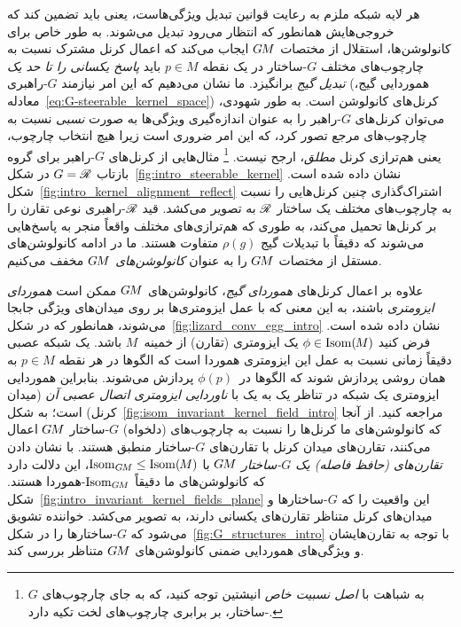هر لایه شبکه ملزم به رعایت قوانین تبدیل ویژگی‌هاست، یعنی باید تضمین کند که خروجی‌هایش همانطور که انتظار می‌رود تبدیل می‌شوند.
به طور خاص برای کانولوشن‌ها، استقلال از مختصات $G\mkern-1.4muM$ ایجاب می‌کند که اعمال کرنل مشترک نسبت به چارچوب‌های مختلف $G$-ساختار در یک نقطه $p\in M$ باید \emph{پاسخ یکسانی را تا حد یک تبدیل گیج} برانگیزد.
ما نشان می‌دهیم که این امر نیازمند $G$-راهبری (هموردایی گیج، معادله~\eqref{eq:G-steerable_kernel_space}) کرنل‌های کانولوشن است.
به طور شهودی، می‌توان کرنل‌های $G$-راهبر را به عنوان اندازه‌گیری ویژگی‌ها به صورت \emph{نسبی} نسبت به چارچوب‌های مرجع تصور کرد، که این امر ضروری است زیرا هیچ انتخاب چارچوب، یعنی هم‌ترازی کرنل \emph{مطلق}، ارجح نیست.%
\footnote{
	به شباهت با \emph{اصل نسبیت خاص} انیشتین توجه کنید، که به جای چارچوب‌های $G$-ساختار، بر برابری چارچوب‌های لخت تکیه دارد.
}
مثال‌هایی از کرنل‌های $G$-راهبر برای گروه بازتاب $G=\mathscr{R}$ در شکل~\ref{fig:intro_steerable_kernel} نشان داده شده است.
شکل~\ref{fig:intro_kernel_alignment_reflect} اشتراک‌گذاری چنین کرنل‌هایی را نسبت به چارچوب‌های مختلف یک ساختار $\mathscr{R}$ به تصویر می‌کشد.
قید $\mathscr{R}$-راهبری نوعی تقارن را بر کرنل‌ها تحمیل می‌کند، به طوری که هم‌ترازی‌های مختلف واقعاً منجر به پاسخ‌هایی می‌شوند که دقیقاً با تبدیلات گیج $\rho(g)$ متفاوت هستند.
ما در ادامه کانولوشن‌های مستقل از مختصات $G\mkern-1.4muM$ را به عنوان \emph{کانولوشن‌های} $G\mkern-1.4muM$ مخفف می‌کنیم.


علاوه بر اعمال کرنل‌های \emph{هموردای گیج}، کانولوشن‌های $G\mkern-1.4muM$ ممکن است \emph{هموردای ایزومتری} باشند، به این معنی که با عمل ایزومتری‌ها بر روی میدان‌های ویژگی جابجا می‌شوند، همانطور که در شکل~\ref{fig:lizard_conv_egg_intro} نشان داده شده است.
فرض کنید $\phi \in \operatorname{Isom}(\mkern-1.5mu M \mkern-.5mu)$ یک ایزومتری (تقارن) از خمینه~$M$ باشد.
یک شبکه عصبی دقیقاً زمانی نسبت به عمل این ایزومتری هموردا است که الگوها در هر نقطه $p\in M$ به همان روشی پردازش شوند که الگوها در~$\phi(p)$ پردازش می‌شوند.
بنابراین هموردایی ایزومتری یک شبکه در تناظر یک به یک با \emph{ناوردایی ایزومتری اتصال عصبی آن} (میدان کرنل) است؛ به شکل~\ref{fig:isom_invariant_kernel_field_intro} مراجعه کنید.
از آنجا که کانولوشن‌های ما کرنل‌ها را نسبت به چارچوب‌های (دلخواه) $G$-ساختار $G\mkern-1.4muM$ اعمال می‌کنند، تقارن‌های میدان کرنل با تقارن‌های $G$-ساختار منطبق هستند.
با نشان دادن \emph{تقارن‌های (حافظ فاصله) یک $G$-ساختار} $G\mkern-1.4muM$ با $\operatorname{Isom}_{G\mkern-1.4muM} \leq \operatorname{Isom}(\mkern-1.5mu M \mkern-.5mu)$، این دلالت دارد که کانولوشن‌های ما دقیقاً $\operatorname{Isom}_{G\mkern-1.4muM}$-هموردا هستند.
شکل~\ref{fig:intro_invariant_kernel_fields_plane} این واقعیت را که $G$-ساختارها و میدان‌های کرنل متناظر تقارن‌های یکسانی دارند، به تصویر می‌کشد.
خواننده تشویق می‌شود که $G$-ساختارها را در شکل~\ref{fig:G_structures_intro} با توجه به تقارن‌هایشان و ویژگی‌های هموردایی ضمنی کانولوشن‌های $G\mkern-1.4muM$ متناظر بررسی کند.


